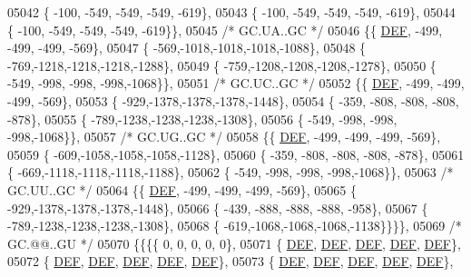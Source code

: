 \begin{DoxyCode}
05042 \{ -100, -549, -549, -549, -619\},
05043 \{ -100, -549, -549, -549, -619\},
05044 \{ -100, -549, -549, -549, -619\}\},
05045 \textcolor{comment}{/* GC.UA..GC */}
05046 \{\{  \mbox{\hyperlink{1_88_84__epars_8h_a397419fc12b37ed479c8abb9d444d843}{DEF}}, -499, -499, -499, -569\},
05047 \{ -569,-1018,-1018,-1018,-1088\},
05048 \{ -769,-1218,-1218,-1218,-1288\},
05049 \{ -759,-1208,-1208,-1208,-1278\},
05050 \{ -549, -998, -998, -998,-1068\}\},
05051 \textcolor{comment}{/* GC.UC..GC */}
05052 \{\{  \mbox{\hyperlink{1_88_84__epars_8h_a397419fc12b37ed479c8abb9d444d843}{DEF}}, -499, -499, -499, -569\},
05053 \{ -929,-1378,-1378,-1378,-1448\},
05054 \{ -359, -808, -808, -808, -878\},
05055 \{ -789,-1238,-1238,-1238,-1308\},
05056 \{ -549, -998, -998, -998,-1068\}\},
05057 \textcolor{comment}{/* GC.UG..GC */}
05058 \{\{  \mbox{\hyperlink{1_88_84__epars_8h_a397419fc12b37ed479c8abb9d444d843}{DEF}}, -499, -499, -499, -569\},
05059 \{ -609,-1058,-1058,-1058,-1128\},
05060 \{ -359, -808, -808, -808, -878\},
05061 \{ -669,-1118,-1118,-1118,-1188\},
05062 \{ -549, -998, -998, -998,-1068\}\},
05063 \textcolor{comment}{/* GC.UU..GC */}
05064 \{\{  \mbox{\hyperlink{1_88_84__epars_8h_a397419fc12b37ed479c8abb9d444d843}{DEF}}, -499, -499, -499, -569\},
05065 \{ -929,-1378,-1378,-1378,-1448\},
05066 \{ -439, -888, -888, -888, -958\},
05067 \{ -789,-1238,-1238,-1238,-1308\},
05068 \{ -619,-1068,-1068,-1068,-1138\}\}\}\},
05069 \textcolor{comment}{/* GC.@@..GU */}
05070 \{\{\{\{    0,    0,    0,    0,    0\},
05071 \{  \mbox{\hyperlink{1_88_84__epars_8h_a397419fc12b37ed479c8abb9d444d843}{DEF}},  \mbox{\hyperlink{1_88_84__epars_8h_a397419fc12b37ed479c8abb9d444d843}{DEF}},  \mbox{\hyperlink{1_88_84__epars_8h_a397419fc12b37ed479c8abb9d444d843}{DEF}},  \mbox{\hyperlink{1_88_84__epars_8h_a397419fc12b37ed479c8abb9d444d843}{DEF}},  \mbox{\hyperlink{1_88_84__epars_8h_a397419fc12b37ed479c8abb9d444d843}{DEF}}\},
05072 \{  \mbox{\hyperlink{1_88_84__epars_8h_a397419fc12b37ed479c8abb9d444d843}{DEF}},  \mbox{\hyperlink{1_88_84__epars_8h_a397419fc12b37ed479c8abb9d444d843}{DEF}},  \mbox{\hyperlink{1_88_84__epars_8h_a397419fc12b37ed479c8abb9d444d843}{DEF}},  \mbox{\hyperlink{1_88_84__epars_8h_a397419fc12b37ed479c8abb9d444d843}{DEF}},  \mbox{\hyperlink{1_88_84__epars_8h_a397419fc12b37ed479c8abb9d444d843}{DEF}}\},
05073 \{  \mbox{\hyperlink{1_88_84__epars_8h_a397419fc12b37ed479c8abb9d444d843}{DEF}},  \mbox{\hyperlink{1_88_84__epars_8h_a397419fc12b37ed479c8abb9d444d843}{DEF}},  \mbox{\hyperlink{1_88_84__epars_8h_a397419fc12b37ed479c8abb9d444d843}{DEF}},  \mbox{\hyperlink{1_88_84__epars_8h_a397419fc12b37ed479c8abb9d444d843}{DEF}},  \mbox{\hyperlink{1_88_84__epars_8h_a397419fc12b37ed479c8abb9d444d843}{DEF}}\},

\end{DoxyCode}
